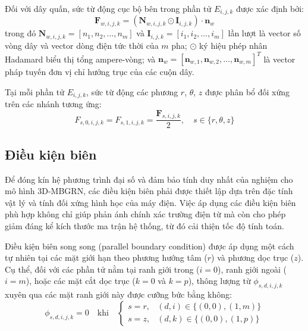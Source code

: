 Đối với dây quấn, sức từ động cục bộ bên trong phần tử $E_{i,j,k}$ được xác định bởi:
\begin{equation}
    \mathbf{F}_{w,i,j,k} = (\mathbf{N}_{w,i,j,k} \odot \mathbf{I}_{i,j,k}) \cdot \mathbf{n}_w
\end{equation}
trong đó $\mathbf{N}_{w,i,j,k} = [n_1, n_2, \dots, n_m]$ và $\mathbf{I}_{i,j,k} = [i_1, i_2, \dots, i_m]$ lần lượt là vector số vòng dây và vector dòng điện tức thời của $m$ pha; $\odot$ ký hiệu phép nhân Hadamard biểu thị tổng ampere-vòng; và $\mathbf{n}_w = [\mathbf{n}_{w,1}, \mathbf{n}_{w,2}, \dots, \mathbf{n}_{w,m}]^T$ là vector pháp tuyến đơn vị chỉ hướng trục của các cuộn dây.

Tại mỗi phần tử $E_{i,j,k}$, sức từ động các phương $r$, $\theta$, $z$ được phân bổ đối xứng trên các nhánh tương ứng:
\begin{equation}
    F_{s,0,i,j,k} = F_{s,1,i,j,k} = \frac{\mathbf{F}_{s,i,j,k}}{2}, \quad s \in \{r, \theta, z\}
\end{equation}

\subsection{Điều kiện biên}
Để đóng kín hệ phương trình đại số và đảm bảo tính duy nhất của nghiệm cho mô hình 3D-MBGRN, các điều kiện biên phải được thiết lập dựa trên đặc tính vật lý và tính đối xứng hình học của máy điện. Việc áp dụng các điều kiện biên phù hợp không chỉ giúp phản ánh chính xác trường điện từ mà còn cho phép giảm đáng kể kích thước ma trận hệ thống, từ đó cải thiện tốc độ tính toán.

Điều kiện biên song song (parallel boundary condition) được áp dụng một cách tự nhiên tại các mặt giới hạn theo phương hướng tâm ($r$) và phương dọc trục ($z$). Cụ thể, đối với các phần tử nằm tại ranh giới trong ($i=0$), ranh giới ngoài ($i=m$), hoặc các mặt cắt dọc trục ($k=0$ và $k=p$), thông lượng từ $\phi_{s,d,i,j,k}$ xuyên qua các mặt ranh giới này được cưỡng bức bằng không:
\begin{equation}
\phi_{s, d, i, j, k} = 0 \quad \text{khi} \quad
\begin{cases} 
s = r, & (d, i) \in \{(0, 0), (1, m)\} \\ 
s = z, & (d, k) \in \{(0, 0), (1, p)\} 
\end{cases}
\end{equation}

